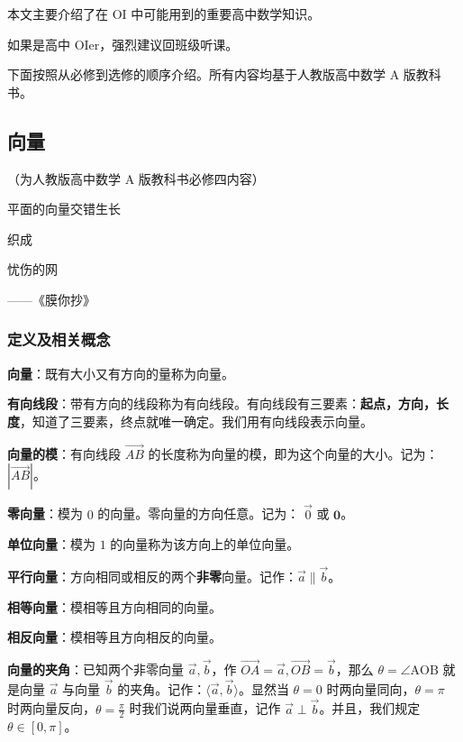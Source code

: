 本文主要介绍了在 OI 中可能用到的重要高中数学知识。

如果是高中 OIer，强烈建议回班级听课。

下面按照从必修到选修的顺序介绍。所有内容均基于人教版高中数学 A 版教科书。

\subsection{向量}

（为人教版高中数学 A 版教科书必修四内容）

\begin{QUOTE}{}{}
平面的向量交错生长



织成



忧伤的网



——《膜你抄》
\end{QUOTE}

\subsubsection{定义及相关概念}

\textbf{向量}：既有大小又有方向的量称为向量。

\textbf{有向线段}：带有方向的线段称为有向线段。有向线段有三要素：\textbf{起点，方向，长度}，知道了三要素，终点就唯一确定。我们用有向线段表示向量。

\textbf{向量的模}：有向线段 $\vec{AB}$ 的长度称为向量的模，即为这个向量的大小。记为：$|\vec{AB}|$。

\textbf{零向量}：模为 $0$ 的向量。零向量的方向任意。记为： $\vec{0}$ 或 $\mathbf{0}$。

\textbf{单位向量}：模为 $1$ 的向量称为该方向上的单位向量。

\textbf{平行向量}：方向相同或相反的两个\textbf{非零}向量。记作：$\vec a\parallel \vec b$。

\textbf{相等向量}：模相等且方向相同的向量。

\textbf{相反向量}：模相等且方向相反的向量。

\textbf{向量的夹角}：已知两个非零向量 $\vec a,\vec b$，作 $\vec{OA}=\vec a,\vec{OB}=\vec b$，那么 $\theta=\angle \text{AOB}$ 就是向量 $\vec a$ 与向量 $\vec b$ 的夹角。记作：$\langle \vec a,\vec b\rangle$。显然当 $\theta =0$ 时两向量同向，$\theta=\pi$ 时两向量反向，$\theta=\frac{\pi}{2}$ 时我们说两向量垂直，记作 $\vec a\perp \vec b$。并且，我们规定 $\theta \in [0,\pi]$。


